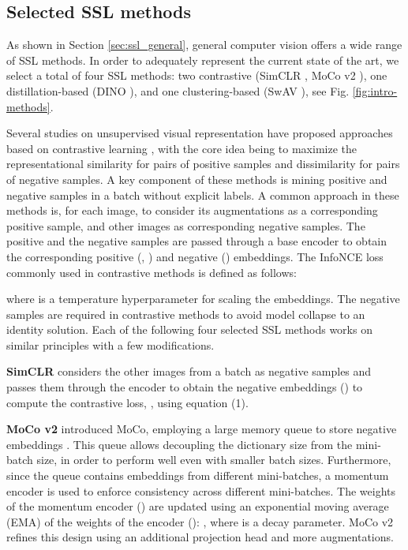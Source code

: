 \documentclass[times,twocolumn,final]{elsarticle}
\begin{document}
\subsection{Selected SSL methods}
As shown in Section \ref{sec:ssl_general}, general computer vision offers a wide range of SSL methods. In order to adequately represent the current state of the art, we select a total of four SSL methods: two contrastive (SimCLR \citep{chen2020simple}, MoCo v2 \citep{he2020momentum,chen2020improved}), one distillation-based (DINO \citep{caron2020unsupervised}), and one clustering-based (SwAV \citep{caron2020unsupervised}), see Fig. \ref{fig:intro-methods}.

Several studies on unsupervised visual representation have proposed approaches based on contrastive learning \citep{hadsell2006dimensionality,wu2018unsupervised,van2018representation,hjelm2018learning,zhuang2019local,henaff2020data,tian2020contrastive,bachman2019learning}, with the core idea being to maximize the representational similarity for pairs of positive samples and dissimilarity for pairs of negative samples. A key component of these methods is mining positive and negative samples in a batch without explicit labels. A common approach in these methods is, for each image, to consider its augmentations as a corresponding positive sample, and other images as corresponding negative samples. The positive and the negative samples are passed through a base encoder to obtain the corresponding positive (, ) and negative () embeddings. The InfoNCE loss \citep{oord2018representation} commonly used in contrastive methods is defined as follows:

where  is a temperature hyperparameter for scaling the embeddings. The negative samples are required in contrastive methods to avoid model collapse to an identity solution. Each of the following four selected SSL methods works on similar principles with a few modifications.

\noindent\textbf{SimCLR} \citep{chen2020simple} considers the other images from a batch as negative samples and passes them through the encoder to obtain the negative embeddings () to compute the contrastive loss, , using equation (1).

\noindent\textbf{MoCo v2} \cite{he2020momentum} introduced MoCo, employing a large memory queue to store negative embeddings . This queue allows decoupling the dictionary size from the mini-batch size, in order to perform well even with smaller batch sizes. Furthermore, since the queue contains embeddings from different mini-batches, a momentum encoder is used to enforce consistency across different mini-batches. The weights of the momentum encoder () are updated using an exponential moving average (EMA) of the weights of the encoder (): , where  is a decay parameter. MoCo v2 \citep{chen2020improved} refines this design using an additional projection head and more augmentations.
\end{document}
